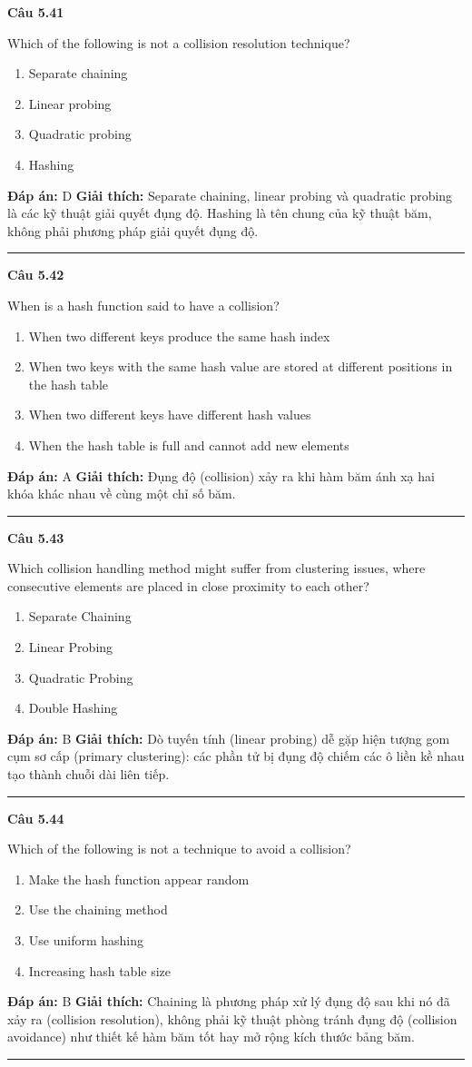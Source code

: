\documentclass[11pt,a4paper]{article}
\newenvironment{question}[1]{%
  \par\vspace{1em}\noindent\textbf{\large Câu #1}\par\vspace{0.4em}
}{%
  \par\vspace{1em}\hrule\vspace{0.6em}
}
\newenvironment{choices}{%
  \begin{enumerate}[label=\textbf{\Alph*.},leftmargin=2.2em,itemsep=2pt,topsep=3pt]
}{%
  \end{enumerate}
}
\newcommand{\choice}{\item}
\begin{document}
\begin{question}{5.41}
Which of the following is not a collision resolution technique?
\begin{choices}
\choice Separate chaining
\choice Linear probing
\choice Quadratic probing
\choice Hashing
\end{choices}
\textbf{Đáp án:} D
\textbf{Giải thích:} Separate chaining, linear probing và quadratic probing là các kỹ thuật giải quyết đụng độ. Hashing là tên chung của kỹ thuật băm, không phải phương pháp giải quyết đụng độ.
\end{question}

\begin{question}{5.42}
When is a hash function said to have a collision?
\begin{choices}
\choice When two different keys produce the same hash index
\choice When two keys with the same hash value are stored at different positions in the hash table
\choice When two different keys have different hash values
\choice When the hash table is full and cannot add new elements
\end{choices}
\textbf{Đáp án:} A
\textbf{Giải thích:} Đụng độ (collision) xảy ra khi hàm băm ánh xạ hai khóa khác nhau về cùng một chỉ số băm.
\end{question}

\begin{question}{5.43}
Which collision handling method might suffer from clustering issues, where consecutive elements are placed in close proximity to each other?
\begin{choices}
\choice Separate Chaining
\choice Linear Probing
\choice Quadratic Probing
\choice Double Hashing
\end{choices}
\textbf{Đáp án:} B
\textbf{Giải thích:} Dò tuyến tính (linear probing) dễ gặp hiện tượng gom cụm sơ cấp (primary clustering): các phần tử bị đụng độ chiếm các ô liền kề nhau tạo thành chuỗi dài liên tiếp.
\end{question}

\begin{question}{5.44}
Which of the following is not a technique to avoid a collision?
\begin{choices}
\choice Make the hash function appear random
\choice Use the chaining method
\choice Use uniform hashing
\choice Increasing hash table size
\end{choices}
\textbf{Đáp án:} B
\textbf{Giải thích:} Chaining là phương pháp xử lý đụng độ sau khi nó đã xảy ra (collision resolution), không phải kỹ thuật phòng tránh đụng độ (collision avoidance) như thiết kế hàm băm tốt hay mở rộng kích thước bảng băm.
\end{question}
\end{document}
